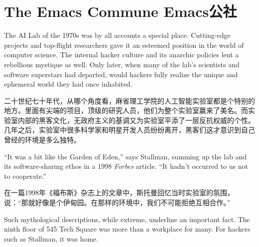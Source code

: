 \chapter{\ifdefined\eng
The Emacs Commune
\fi
\ifdefined\chs
Emacs公社
\fi
}
\thispagestyle{empty}
\ifdefined\eng
The AI Lab of the 1970s was by all accounts a special place. Cutting-edge projects and top-flight researchers gave it an esteemed position in the world of computer science. The internal hacker culture and its anarchic policies lent a rebellious mystique as well. Only later, when many of the lab's scientists and software superstars had departed, would hackers fully realize the unique and ephemeral world they had once inhabited.
\fi

\ifdefined\chs
二十世纪七十年代，从哪个角度看，麻省理工学院的人工智能实验室都是个特别的地方。里面有尖端的项目，顶级的研究人员，他们为整个实验室赢来了美名。而实验室内部的黑客文化，无政府主义的基调又为实验室平添了一层反抗权威的个性。几年之后，实验室中很多科学家和明星开发人员纷纷离开，黑客们这才意识到自己曾经的环境是多么独特。
\fi

\ifdefined\eng
``It was a bit like the Garden of Eden,'' says Stallman, summing up the lab and its software-sharing ethos in a 1998 \textit{Forbes} article. ``It hadn't occurred to us not to cooperate.''
\fi

\ifdefined\chs
在一篇1998年《福布斯》杂志上的文章中，斯托曼回忆当时实验室的氛围，说：``那就好像是个伊甸园。在那样的环境中，我们不可能拒绝互相合作。''
\fi

\ifdefined\eng
Such mythological descriptions, while extreme, underline an important fact. The ninth floor of 545 Tech Square was more than a workplace for many. For hackers such as Stallman, it was home.
\fi

